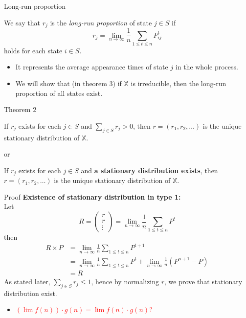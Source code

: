 \documentclass{beamer}
\begin{document}
\begin{frame}{Long-run proportion}
	\begin{definition}
		We say that $r_j$ is the \textit{long-run proportion} of state $j \in S$ if
		\[
		r_j = \lim_{n\to\infty} \frac{1}{n} \sum_{1 \leq t \leq n} P^t_{ij}
		\]
		holds for each state $i \in S$.
	\end{definition}
	\begin{itemize}
		\item It represents the average appearance times of state $j$ in the whole process.
		\item We will show that (in theorem 3) if $\mathbb{X}$ is irreducible, then the long-run proportion of all states exist.
	\end{itemize}
\end{frame}

\begin{frame}{Theorem 2}
	\begin{theorem}[type 1]
	If $r_j$ exists for each $j \in S$ and $\sum_{j \in S} r_j > 0$,
	then $r = (r_1, r_2, \ldots)$ is the unique stationary distribution of $\mathbb{X}$.
	\end{theorem}
	or
	\begin{theorem}[type 2]
	If $r_j$ exists for each $j \in S$ and \textbf{a stationary distribution exists},
	then $r = (r_1, r_2, \ldots)$ is the unique stationary distribution of $\mathbb{X}$.
	\end{theorem}
\end{frame}

\begin{frame}[shrink]{Proof}
	\textbf{Existence of stationary distribution in type 1:} \\
	Let 
	\[
	R = 
	\begin{pmatrix}
		r \\
		r \\
		\vdots
	\end{pmatrix} 
	= \lim_{n\to\infty} \frac{1}{n} \sum_{1 \leq t \leq n} P^t
	\]
	then
	\begin{align*}
		R \times P &= \lim_{n\to\infty} \frac{1}{n} \sum_{1 \leq t \leq n} P^{t+1} \\
		&= \lim_{n\to\infty} \frac{1}{n} \sum_{1 \leq t \leq n} P^t + \lim_{n\to\infty} \frac{1}{n}(P^{n+1} - P) \\
		&= R
	\end{align*}
	As stated later, $\sum_{j \in S} r_j \leq 1$, hence by normalizing $r$, we prove that stationary distribution exist.
	\begin{itemize}
	\item \textcolor{red}{$(\lim f(n))\cdot g(n) = \lim f(n) \cdot g(n)$?}
	\end{itemize}
\end{frame}
\end{document}
